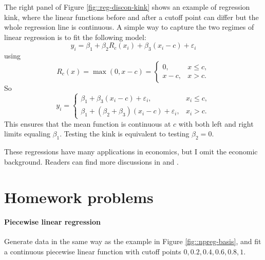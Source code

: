 The right panel of Figure \ref{fig::reg-discon-kink} shows an example of regression kink, where the linear functions before and after a cutoff point can differ but the whole regression line is continuous. A simple way to capture the two regimes of linear regression is to fit the following model: 
\[
y_{i}=\beta_{1}+\beta_{2}R_{c}(x_{i})+\beta_{3}(x_{i}-c)+\varepsilon_{i}
\]
using  
\[
R_{c}(x)=\max(0,x-c)=\begin{cases}
0, & x\leq c,\\
x-c, & x>c.
\end{cases}
\]
So 
\[
y_{i}=\begin{cases}
\beta_{1}+\beta_{3}(x_{i}-c)+\varepsilon_{i}, & x_{i}\leq c,\\
\beta_{1}+\left(\beta_{2}+\beta_{3}\right)(x_{i}-c)+\varepsilon_{i}, & x_{i}>c.
\end{cases}
\]
This ensures that the mean function is continuous at $c$ with both
left and right limits equaling $\beta_{1}$. Testing the kink is equivalent
to testing $\beta_{2}=0.$


These regressions have many applications in economics, but I omit the economic background. Readers can find more discussions in  \citet{angrist2008mostly} and \citet{card2015inference}.



\section{Homework problems}


\paragraph{Piecewise linear regression}

Generate data in the same way as the example in Figure \ref{fig::npreg-basis}, and fit a continuous piecewise linear function with cutoff points $0,0.2,0.4,0.6,0.8,1$. 

 

